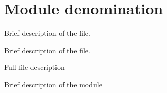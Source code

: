 \hypertarget{group__name}{}\section{Module denomination}
\label{group__name}


Brief description of the file.  


Brief description of the file. 

Full file description

Brief description of the module 